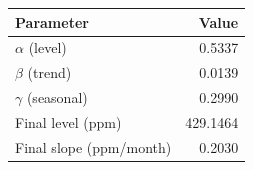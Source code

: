 \begin{tabular}{lr}
\toprule
Parameter & Value\\
\midrule
$\alpha$ (level) & 0.5337\\
$\beta$ (trend) & 0.0139\\
$\gamma$ (seasonal) & 0.2990\\
Final level (ppm) & 429.1464\\
Final slope (ppm/month) & 0.2030\\
\bottomrule
\end{tabular}
